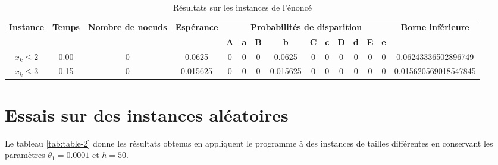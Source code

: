 \documentclass[12pt]{extarticle}
\begin{document}
\begin{table}[h!]
    \scriptsize
    \centering
    \begin{tabular}{|c|c|c|c|c|c|c|c|c|c|c|c|c|c|c|}
        \hline
        \multirow{2}{*}{\textbf{Instance}} & \multirow{2}{*}{\textbf{Temps}} & \multirow{2}{*}{\textbf{Nombre de noeuds}} & \multirow{2}{*}{\textbf{Espérance}} & \multicolumn{10}{|c|}{\textbf{Probabilités de disparition}} & \textbf{Borne inférieure} \\
        & & & & \textbf{A} & \textbf{a} & \textbf{B} & \textbf{b} & \textbf{C} & \textbf{c} & \textbf{D} & \textbf{d} & \textbf{E} & \textbf{e} & \\
        \hline
        \textbf{$x_k \leq 2$} & 0.00 & 0 & 0.0625 & 0 & 0 & 0 & 0.0625 & 0 & 0 & 0 & 0 & 0 & 0 & 0.06243336502896749 \\
        \hline
        \textbf{$x_k \leq 3$} & 0.15 & 0 & 0.015625 & 0 & 0 & 0 & 0.015625 & 0 & 0 & 0 & 0 & 0 & 0 & 0.015620569018547845 \\
        \hline
    \end{tabular}
    \caption{Résultats sur les instances de l'énoncé}
    \label{tab:table-1}
\end{table}

\section{Essais sur des instances aléatoires}

Le tableau \ref{tab:table-2} donne les résultats obtenus en appliquent le programme à des instances de tailles différentes en conservant les paramètres $\theta_1 = 0.0001$ et $h = 50$.
\end{document}

